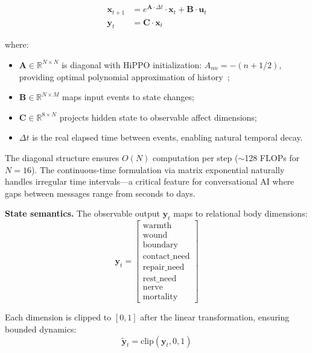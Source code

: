 \documentclass[10pt,twocolumn]{article}
\begin{document}
\begin{align}
\mathbf{x}_{t+1} &= e^{\mathbf{A} \cdot \Delta t} \cdot \mathbf{x}_t + \mathbf{B} \cdot \mathbf{u}_t \label{eq:ssm_state} \\
\mathbf{y}_t &= \mathbf{C} \cdot \mathbf{x}_t \label{eq:ssm_output}
\end{align}

where:
\begin{itemize}[nosep,leftmargin=*]
\item $\mathbf{A} \in \mathbb{R}^{N \times N}$ is diagonal with HiPPO initialization: $A_{nn} = -(n + 1/2)$, providing optimal polynomial approximation of history~\cite{hippo2020};
\item $\mathbf{B} \in \mathbb{R}^{N \times M}$ maps input events to state changes;
\item $\mathbf{C} \in \mathbb{R}^{8 \times N}$ projects hidden state to observable affect dimensions;
\item $\Delta t$ is the real elapsed time between events, enabling natural temporal decay.
\end{itemize}

The diagonal structure ensures $O(N)$ computation per step ($\sim$128 FLOPs for $N=16$). The continuous-time formulation via matrix exponential naturally handles irregular time intervals---a critical feature for conversational AI where gaps between messages range from seconds to days.

\textbf{State semantics.} The observable output $\mathbf{y}_t$ maps to relational body dimensions:
\begin{equation}
\mathbf{y}_t = \begin{bmatrix} \text{warmth} \\ \text{wound} \\ \text{boundary} \\ \text{contact\_need} \\ \text{repair\_need} \\ \text{rest\_need} \\ \text{nerve} \\ \text{mortality} \end{bmatrix}
\end{equation}

Each dimension is clipped to $[0,1]$ after the linear transformation, ensuring bounded dynamics:
\begin{equation}
\tilde{\mathbf{y}}_t = \text{clip}(\mathbf{y}_t, 0, 1)
\end{equation}
\end{document}
